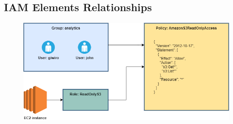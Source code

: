 \subsection{IAM Elements Relationships}
\begin{figure}[h]
\includegraphics[scale=0.5]{iam/iam}
\centering
\end{figure}